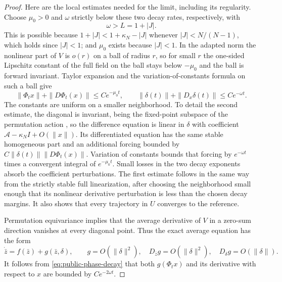 \begin{proof}
Here are the local estimates needed for the limit, including its regularity. Choose $\mu_0>0$ and $\omega$ strictly below these two decay rates, respectively, with
\begin{equation}
 \omega>L=1+|J|.
 \label{eq:public-phase-gap}
\end{equation}
This is possible because $1+|J|<1+\kappa_N-|J|$ whenever $|J|<N/(N-1)$, which holds since $|J|<1$; and $\mu_0$ exists because $|J|<1$. In the adapted norm the nonlinear part of $V$ is $o(r)$ on a ball of radius $r$, so for small $r$ the one-sided Lipschitz constant of the full field on the ball stays below $-\mu_0$ and the ball is forward invariant. Taylor expansion and the variation-of-constants formula on such a ball give
\begin{equation}
 \|\Phi_t x\|+\|D\Phi_t(x)\|\le C e^{-\mu_0 t},\qquad
 \|\delta(t)\|+\|D_x\delta(t)\|\le C e^{-\omega t}.
 \label{eq:public-phase-decay}
\end{equation}
The constants are uniform on a smaller neighborhood. To detail the second estimate, the diagonal is invariant, being the fixed-point subspace of the permutation action \citep{GolubitskyStewart2002}, so the difference equation is linear in $\delta$ with coefficient $\mathcal A-\kappa_N I+O(\|x\|)$. Its differentiated equation has the same stable homogeneous part and an additional forcing bounded by $C\|\delta(t)\|\|D\Phi_t(x)\|$. Variation of constants bounds that forcing by $e^{-\omega t}$ times a convergent integral of $e^{-\mu_0 t}$. Small losses in the two decay exponents absorb the coefficient perturbations. The first estimate follows in the same way from the strictly stable full linearization, after choosing the neighborhood small enough that its nonlinear derivative perturbation is less than the chosen decay margins. It also shows that every trajectory in $U$ converges to the reference.

Permutation equivariance implies that the average derivative of $V$ in a zero-sum direction vanishes at every diagonal point. Thus the exact average equation has the form
\begin{equation}
 \dot{\bar z}=f(\bar z)+g(\bar z,\delta),\qquad
 g=O(\|\delta\|^2),\quad
 D_{\bar z}g=O(\|\delta\|^2),\quad D_\delta g=O(\|\delta\|).
 \label{eq:public-phase-residual}
\end{equation}
It follows from \cref{eq:public-phase-decay} that both $g(\Phi_t x)$ and its derivative with respect to $x$ are bounded by $Ce^{-2\omega t}$.


\end{proof}
